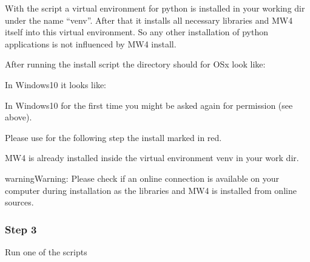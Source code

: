 \documentclass[a4paper,10pt,english]{sphinxmanual}
\begin{document}
\begin{sphinxVerbatim}[commandchars=\\\{\}]
         
          
     
\end{sphinxVerbatim}

\sphinxAtStartPar
With the script a virtual environment for python is installed in your working dir
under the name “venv”. After that it installs all necessary libraries and MW4
itself into this virtual environment. So any other installation of python
applications is not influenced by MW4 install.

\sphinxAtStartPar
After running the install script the directory should for OSx look like:


\sphinxAtStartPar
In Windows10 it looks like:


\sphinxAtStartPar
In Windows10 for the first time you might be asked again for permission (see above).

\sphinxAtStartPar
Please use for the following step the install marked in red.

\sphinxAtStartPar
MW4 is already installed inside the virtual environment venv in your work dir.

\begin{sphinxadmonition}{warning}{Warning:}
\sphinxAtStartPar
Please check if an online connection is available on your computer during
installation as the libraries and MW4 is installed from online sources.
\end{sphinxadmonition}


\subsubsection{Step 3}
\label{\detokenize{install/mw4:step-3}}
\sphinxAtStartPar
Run one of the scripts

\begin{sphinxVerbatim}[commandchars=\\\{\}]
         
          
     
\end{sphinxVerbatim}
\end{document}
